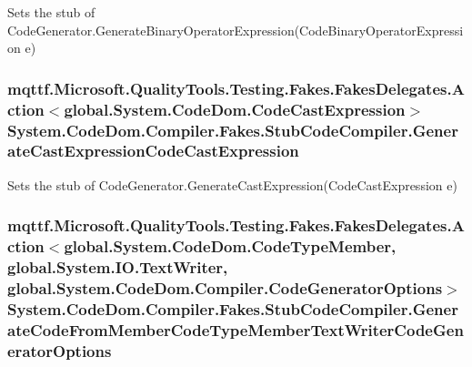 Sets the stub of Code\-Generator.\-Generate\-Binary\-Operator\-Expression(\-Code\-Binary\-Operator\-Expression e)

\hypertarget{class_system_1_1_code_dom_1_1_compiler_1_1_fakes_1_1_stub_code_compiler_a95ad5964419dd7cf63cc21aa09b10c6d}{
\subsubsection[{Generate\-Cast\-Expression\-Code\-Cast\-Expression}]{\setlength{\rightskip}{0pt plus 5cm}mqttf.\-Microsoft.\-Quality\-Tools.\-Testing.\-Fakes.\-Fakes\-Delegates.\-Action$<$global.\-System.\-Code\-Dom.\-Code\-Cast\-Expression$>$ System.\-Code\-Dom.\-Compiler.\-Fakes.\-Stub\-Code\-Compiler.\-Generate\-Cast\-Expression\-Code\-Cast\-Expression}}\label{class_system_1_1_code_dom_1_1_compiler_1_1_fakes_1_1_stub_code_compiler_a95ad5964419dd7cf63cc21aa09b10c6d}


Sets the stub of Code\-Generator.\-Generate\-Cast\-Expression(\-Code\-Cast\-Expression e)

\hypertarget{class_system_1_1_code_dom_1_1_compiler_1_1_fakes_1_1_stub_code_compiler_a2bfd4f292e5b93b85deb404c5826a60c}{
\subsubsection[{Generate\-Code\-From\-Member\-Code\-Type\-Member\-Text\-Writer\-Code\-Generator\-Options}]{\setlength{\rightskip}{0pt plus 5cm}mqttf.\-Microsoft.\-Quality\-Tools.\-Testing.\-Fakes.\-Fakes\-Delegates.\-Action$<$global.\-System.\-Code\-Dom.\-Code\-Type\-Member, global.\-System.\-I\-O.\-Text\-Writer, global.\-System.\-Code\-Dom.\-Compiler.\-Code\-Generator\-Options$>$ System.\-Code\-Dom.\-Compiler.\-Fakes.\-Stub\-Code\-Compiler.\-Generate\-Code\-From\-Member\-Code\-Type\-Member\-Text\-Writer\-Code\-Generator\-Options}}\label{class_system_1_1_code_dom_1_1_compiler_1_1_fakes_1_1_stub_code_compiler_a2bfd4f292e5b93b85deb404c5826a60c}


